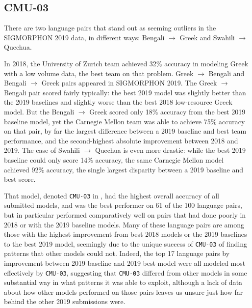 \subsection{CMU-03}

There are two language pairs that stand out as seeming outliers in the SIGMORPHON 2019 data, in different ways: Bengali $\rightarrow$ Greek and Swahili $\rightarrow$ Quechua. 

In 2018, the University of Zurich team achieved 32\% accuracy in modeling Greek with a low volume data, the best team on that problem. Greek $\rightarrow$ Bengali and Bengali $\rightarrow$ Greek pairs appeared in SIGMORPHON 2019. The Greek $\rightarrow$ Bengali pair scored fairly typically: the best 2019 model was slightly better than the 2019 baselines and slightly worse than the best 2018 low-resource Greek model. But the Bengali $\rightarrow$ Greek scored only 18\% accuracy from the best 2019 baseline model, yet the Carnegie Mellon team was able to achieve 75\% accuracy on that pair, by far the largest difference between a 2019 baseline and best team performance, and the second-highest absolute improvement between 2018 and 2019. The case of Swahili $\rightarrow$ Quechua is even more drastic: while the best 2019 baseline could only score 14\% accuracy, the same Carnegie Mellon model achieved 92\% accuracy, the single largest disparity between a 2019 baseline and best score.

That model, denoted \texttt{CMU-03} in \cite{McCarthy2019}, had the highest overall accuracy of all submitted models, and was the best performer on 61 of the 100 language pairs, but in particular performed comparatively well on pairs that had done poorly in 2018 or with the 2019 baseline models. Many of these language pairs are among those with the highest improvement from best 2018 models or the 2019 baselines to the best 2019 model, seemingly due to the unique success of \texttt{CMU-03} of finding patterns that other models could not. Indeed, the top 17 language pairs by improvement between 2019 baseline and 2019 best model were all modeled most effectively by \texttt{CMU-03}, suggesting that \texttt{CMU-03} differed from other models in some substantial way in what patterns it was able to exploit, although a lack of data about how other models performed on those pairs leaves us unsure just how far behind the other 2019 submissions were.

